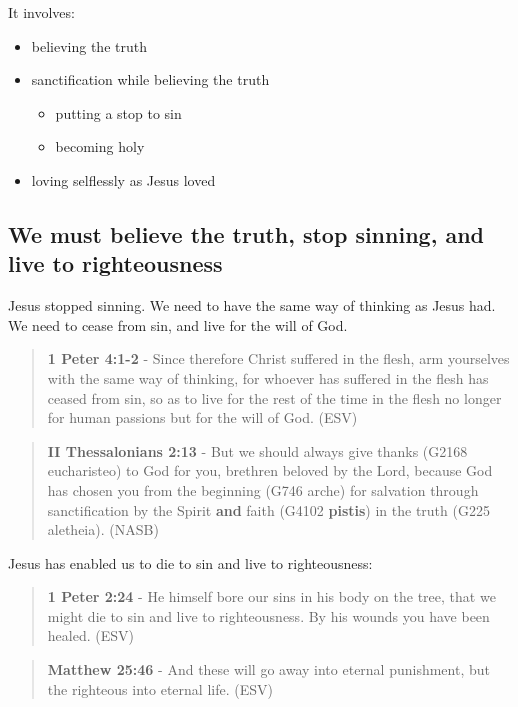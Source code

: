 \documentclass[11pt]{article}
\begin{document}
It involves:
\begin{itemize}
\item believing the truth
\item sanctification while believing the truth
\begin{itemize}
\item putting a stop to sin
\item becoming holy
\end{itemize}
\item loving selflessly as Jesus loved
\end{itemize}

\subsection{We must believe the truth, stop sinning, and live to righteousness}
\label{sec:orgcbd88c3}
Jesus stopped sinning. We need to have the same way of thinking as Jesus had.
We need to cease from sin, and live for the will of God.

\begin{quote}
\textbf{1 Peter 4:1-2} - Since therefore Christ suffered in the flesh, arm yourselves with the same way of thinking, for whoever has suffered in the flesh has ceased from sin, so as to live for the rest of the time in the flesh no longer for human passions but for the will of God. (ESV)
\end{quote}

\begin{quote}
\textbf{II Thessalonians 2:13} - But we should always give thanks (G2168 eucharisteo) to God for you, brethren beloved by the Lord, because God has chosen you from the beginning (G746 arche) for salvation through sanctification by the Spirit \textbf{and} faith (G4102 \textbf{pistis}) in the truth (G225 aletheia). (NASB)
\end{quote}

Jesus has enabled us to die to sin and live to righteousness:

\begin{quote}
\textbf{1 Peter 2:24} - He himself bore our sins in his body on the tree, that we might die to sin and live to righteousness.  By his wounds you have been healed.  (ESV)
\end{quote}

\begin{quote}
\textbf{Matthew 25:46} - And these will go away into eternal punishment, but the righteous into eternal life. (ESV)
\end{quote}
\end{document}
